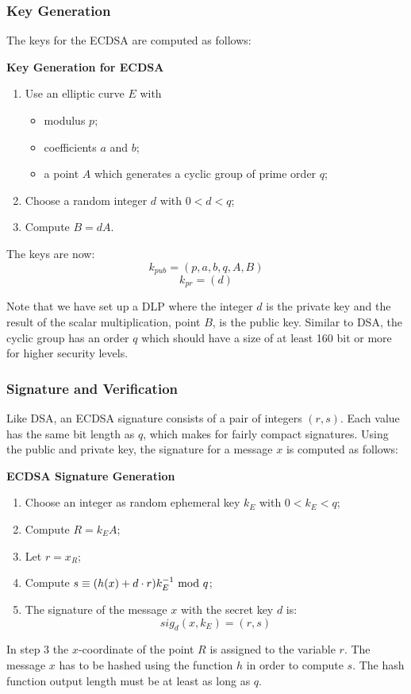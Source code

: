 \subsubsection*{Key Generation}
The keys for the ECDSA are computed as follows:
\begin{framed}
    \hfill\break\textbf{Key Generation for ECDSA}
    \begin{enumerate}
        \item Use an elliptic curve $E$ with
        \begin{itemize}
            \item modulus $p$;
            \item coefficients $a$ and $b$;
            \item a point $A$ which generates a cyclic group of prime order $q$;
        \end{itemize}
        \item Choose a random integer $d$ with $0<d<q$;
        \item Compute $B=dA$.
    \end{enumerate}
    The keys are now:
    $$k_{pub}=(p,a,b,q,A,B)$$
    $$k_{pr}=(d)$$
\end{framed}
Note that we have set up a DLP where the integer $d$ is the private key and the result of the scalar multiplication, point $B$, is the public key. Similar to DSA, the cyclic group has an order $q$ which should have a size of at least 160 bit or more for higher security levels.

\subsubsection*{Signature and Verification}
Like DSA, an ECDSA signature consists of a pair of integers $(r,s)$. Each value has the same bit length as $q$, which makes for fairly compact signatures. Using the public and private key, the signature for a message $x$ is computed as follows:
\begin{framed}
    \hfill\break\textbf{ECDSA Signature Generation}
    \begin{enumerate}
        \item Choose an integer as random ephemeral key $k_E$ with $0<k_E<q$;
        \item Compute $R=k_EA$;
        \item Let $r=x_R$;
        \item Compute $s\equiv (h(x)+d\cdot r)k_E^{-1}\text{ mod } q$;
        \item The signature of the message $x$ with the secret key $d$ is:
        $$sig_d(x,k_E)=(r,s)$$
    \end{enumerate}
\end{framed}
In step 3 the $x$-coordinate of the point $R$ is assigned to the variable $r$. The message $x$ has to be hashed using the function $h$ in order to compute $s$. The hash function output length must be at least as long as $q$.

